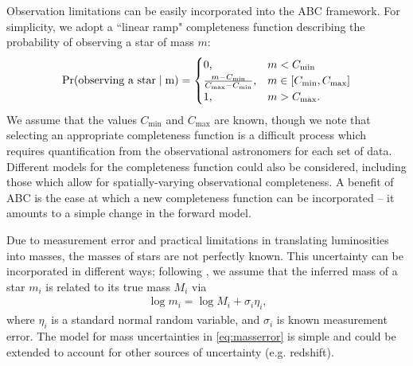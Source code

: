 \documentclass[12pt]{article}
\newcommand{\Proba}{\rm{Pr}}
\newcommand{\Cmin}{C_{\text{min}}}
\newcommand{\Cmax}{C_{\text{max}}}
\begin{document}
Observation limitations can be easily incorporated into the ABC framework.  For simplicity, we adopt a ``linear ramp" completeness function describing the probability of observing a star of mass $m$:
\begin{align}
	\Proba(\text{observing a star} \mid m) = \begin{cases} 0 \text{,} & m < \Cmin\\
								\frac{m - \Cmin}{\Cmax - \Cmin}\text{,} & m \in [\Cmin, \Cmax] \\
								1 \text{,} & m > \Cmax \text{.}
								\end{cases} \label{eq:ramp}
\end{align}
We assume that the values $\Cmin$ and $\Cmax$ are known, though we note that selecting an appropriate completeness function is a difficult process which requires quantification from the observational astronomers for each set of data.
Different models for the completeness function could also be considered, including those which allow for spatially-varying observational completeness.  A benefit of ABC is the ease at which a new completeness function can be incorporated -- it amounts to a simple change in the forward model.  

Due to measurement error and practical limitations in translating luminosities into masses, the masses of stars are not perfectly known. 
This uncertainty can be incorporated in different ways; following \cite{weisz13}, we assume that the inferred mass of a star $m_i$ is related to its true mass $M_i$ via 
\begin{align}
	\log m_i = \log M_i + \sigma_i \eta_i \text{,}
	\label{eq:masserror}
\end{align}
where $\eta_i$ is a standard normal random variable, and $\sigma_i$ is known measurement error.   %
The model for mass uncertainties in \eqref{eq:masserror} is simple and could be extended to account for other sources of uncertainty (e.g. redshift).
\end{document}
